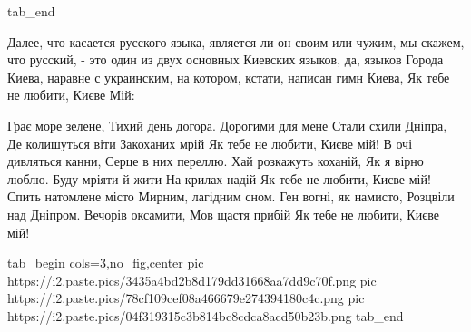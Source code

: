 tab_end
\fi

Далее, что касается русского языка, является ли он своим или чужим, мы скажем,
что русский, - это один из двух основных Киевских языков, да, языков Города
Киева, наравне с украинским, на котором, кстати, написан гимн Киева, Як тебе не
любити, Києве Мій:

\raggedcolumns
\begin{multicols}{3} %
\setlength{\parindent}{0pt}
\obeycr
Грає море зелене,
Тихий день догора.
Дорогими для мене
Стали схили Дніпра,
Де колишуться віти
Закоханих мрій
Як тебе не любити,
Києве мій!
\smallskip
В очі дивляться канни,
Серце в них переллю.
Хай розкажуть коханій,
Як я вірно люблю.
Буду мріяти й жити
На крилах надій
Як тебе не любити,
Києве мій!
\smallskip
Спить натомлене місто
Мирним, лагідним сном.
Ген вогні, як намисто,
Розцвіли над Дніпром.
Вечорів оксамити,
Мов щастя прибій
Як тебе не любити,
Києве мій!
\restorecr
\end{multicols} %

\ifcmt
  tab_begin cols=3,no_fig,center
     pic https://i2.paste.pics/3435a4bd2b8d179dd31668aa7dd9c70f.png
		 pic https://i2.paste.pics/78cf109cef08a466679e274394180c4c.png 
		 pic https://i2.paste.pics/04f319315c3b814bc8cdca8acd50b23b.png
  tab_end
\fi

